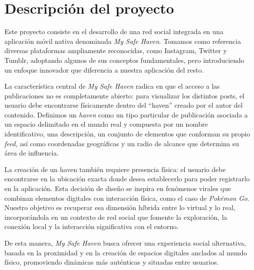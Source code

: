 \section{Descripción del proyecto}

Este proyecto consiste en el desarrollo de una red social integrada en una aplicación móvil nativa 
denominada \textit{My Safe Haven}. Tomamos como referencia diversas plataformas ampliamente reconocidas, 
como Instagram, Twitter y Tumblr, adoptando algunos de sus conceptos fundamentales, pero introduciendo un enfoque 
innovador que diferencia a nuestra aplicación del resto.

La característica central de \textit{My Safe Haven} radica en que el acceso a las publicaciones 
no es completamente abierto: para visualizar los distintos posts, el usuario debe encontrarse físicamente 
dentro del ``haven'' creado por el autor del contenido. Definimos un \textit{haven} como un tipo particular 
de publicación asociada a un espacio delimitado en el mundo real y compuesta por un nombre identificativo, 
una descripción, un conjunto de elementos que conforman su propio \textit{feed}, así como coordenadas geográficas 
y un radio de alcance que determina su área de influencia.

La creación de un haven también requiere presencia física: el usuario debe encontrarse en la ubicación 
exacta donde desea establecerlo para poder registrarlo en la aplicación. Esta decisión de diseño se inspira en fenómenos 
virales que combinan elementos digitales con interacción física, como el caso de \textit{Pokémon Go}. 
Nuestro objetivo es recuperar esa dimensión híbrida entre lo virtual y lo real, incorporándola en un contexto de red 
social que fomente la exploración, la conexión local y la interacción significativa con el entorno.

De esta manera, \textit{My Safe Haven} busca ofrecer una experiencia social alternativa, basada en la 
proximidad y en la creación de espacios digitales anclados al mundo físico, promoviendo dinámicas más auténticas 
y situadas entre usuarios.
\newpage
